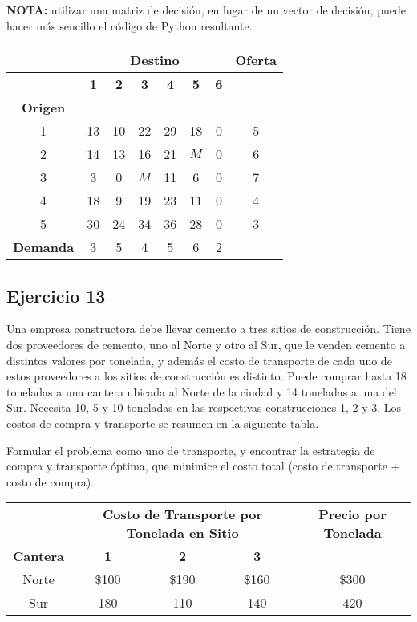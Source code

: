 \documentclass[12pt]{article}
\begin{document}
\textbf{NOTA:} utilizar una matriz de decisión, en lugar de un vector de decisión, puede hacer más sencillo el código de Python resultante.

\begin{center}
\begin{tabular}{c|cccccc|c}
\hline
& \multicolumn{6}{c|}{\textbf{Destino}} & \textbf{Oferta} \\
\hline
& \textbf{1} & \textbf{2} & \textbf{3} & \textbf{4} & \textbf{5} & \textbf{6} &  \\
\hline
\textbf{Origen} & & & & & & & \\
1 & 13 & 10 & 22 & 29 & 18 & 0 & 5 \\
2 & 14 & 13 & 16 & 21 & $M$ & 0 & 6 \\
3 & 3 & 0 & $M$ & 11 & 6 & 0 & 7 \\
4 & 18 & 9 & 19 & 23 & 11 & 0 & 4 \\
5 & 30 & 24 & 34 & 36 & 28 & 0 & 3 \\
\hline
\textbf{Demanda} & 3 & 5 & 4 & 5 & 6 & 2 & \\
\hline
\end{tabular}
\end{center}

\subsection*{Ejercicio 13}

Una empresa constructora debe llevar cemento a tres sitios de construcción. Tiene dos proveedores de cemento, uno al Norte y otro al Sur, que le venden cemento a distintos valores por tonelada, y además el costo de transporte de cada uno de estos proveedores a los sitios de construcción es distinto. Puede comprar hasta 18 toneladas a una cantera ubicada al Norte de la ciudad y 14 toneladas a una del Sur. Necesita 10, 5 y 10 toneladas en las respectivas construcciones 1, 2 y 3. Los costos de compra y transporte se resumen en la siguiente tabla.

Formular el problema como uno de transporte, y encontrar la estrategia de compra y transporte óptima, que minimice el costo total (costo de transporte + costo de compra).

\begin{center}
\begin{tabular}{c|ccc|c}
\toprule
& \multicolumn{3}{c|}{\textbf{Costo de Transporte por Tonelada en Sitio}} & \textbf{Precio por Tonelada} \\
\cmidrule(lr){2-4} 
\textbf{Cantera} & \textbf{1} & \textbf{2} & \textbf{3} & \\
\midrule
Norte & \$100 & \$190 & \$160 & \$300 \\
Sur & 180 & 110 & 140 & 420 \\
\bottomrule
\end{tabular}
\end{center}
\end{document}

